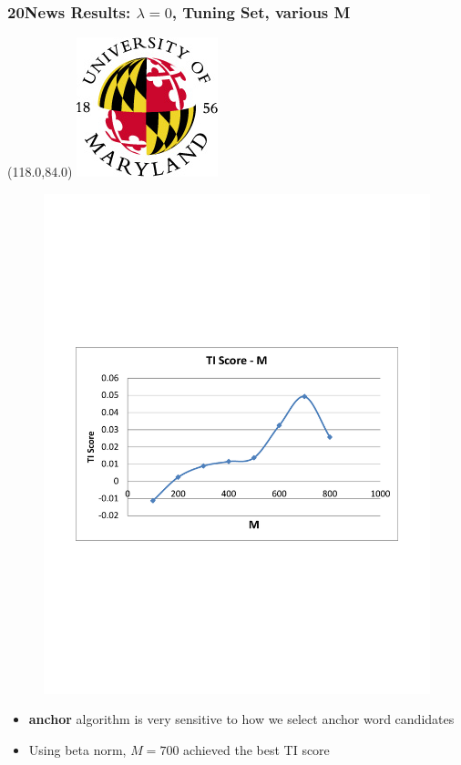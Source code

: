 \documentclass{beamer}
\let\oldframetitle\frametitle
\renewcommand{\frametitle}[1]{
\oldframetitle{#1}
\BottomLogo
}
\newcommand{\BottomLogo}{
\begin{textblock}{14}(118.0,84.0)
\includegraphics[height=.8cm]{figures/umd-logo1.jpg}
\end{textblock}
}
\begin{document}
\begin{frame}

\frametitle{20News Results: $\lambda = 0$, Tuning Set, various M}

\begin{figure}
\includegraphics[width=0.7\linewidth]{figures/20news_M_TI_chart.pdf}
\end{figure}
\vspace{-0.1in}
\begin{itemize}
\item {\bf anchor} algorithm is very sensitive to how we select anchor word candidates
\item Using beta norm, $M=700$ achieved the best TI score
\end{itemize}

\end{frame}
\end{document}
